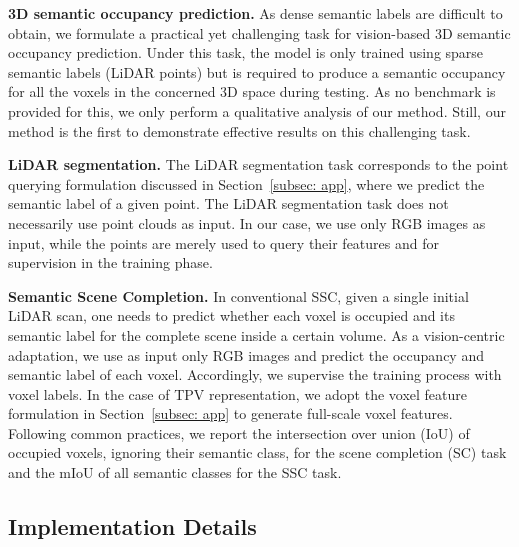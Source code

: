 \documentclass[10pt,twocolumn,letterpaper]{article}
\begin{document}
\textbf{3D semantic occupancy prediction.}
As dense semantic labels are difficult to obtain, we formulate a practical yet challenging task for vision-based 3D semantic occupancy prediction.
Under this task, the model is only trained using sparse semantic labels (LiDAR points) but is required to produce a semantic occupancy for all the voxels in the concerned 3D space during testing.
As no benchmark is provided for this, we only perform a qualitative analysis of our method.
Still, our method is the first to demonstrate effective results on this challenging task.



\textbf{LiDAR segmentation.}
The LiDAR segmentation task corresponds to the point querying formulation discussed in Section~\ref{subsec: app}, where we predict the semantic label of a given point.
The LiDAR segmentation task does not necessarily use point clouds as input.
In our case, we use only RGB images as input, while the points are merely used to query their features and for supervision in the training phase.

\textbf{Semantic Scene Completion.}
In conventional SSC, given a single initial LiDAR scan, one needs to predict whether each voxel is occupied and its semantic label for the complete scene inside a certain volume.
As a vision-centric adaptation, we use as input only RGB images and predict the occupancy and semantic label of each voxel.
Accordingly, we supervise the training process with voxel labels.
In the case of TPV representation, we adopt the voxel feature formulation in Section~\ref{subsec: app} to generate full-scale voxel features.
Following common practices, we report the intersection over union (IoU) of occupied voxels, ignoring their semantic class, for the scene completion (SC) task and the mIoU of all semantic classes for the SSC task.










\subsection{Implementation Details}
\end{document}
